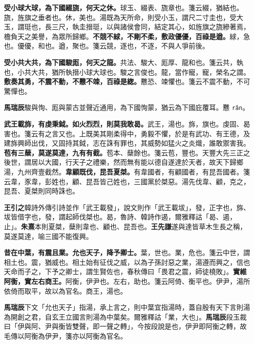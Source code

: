 \textbf{受小球大球，為下國綴旒，何天之休。}{\footnotesize 球玉、綴表、旒章也。箋云綴，猶結也。旒，旌旗之垂者也。休，美也。湯既為天所命，則受小玉，謂尺二寸圭也，受大玉，謂珽也，長三尺，執圭搢珽，以與諸侯會同，結定其心，如旌旗之旒縿著焉，檐負天之美譽，為眾所歸鄉。}\textbf{不競不絿，不剛不柔，敷政優優，百祿是遒。}{\footnotesize 絿，急也。優優，和也。遒，聚也。箋云競，逐也，不逐，不與人爭前後。}

\textbf{受小共大共，為下國駿厖，何天之龍。}{\footnotesize 共法、駿大、厖厚、龍和也。箋云共，執也，小共大共，猶所執搢小球大球也。駿之言俊也。龍，當作寵，寵，榮名之謂。}\textbf{敷奏其勇，不震不動，不戁不竦，百祿是緫。}{\footnotesize 戁恐、竦懼也。箋云不震不動，不可驚憚也。}

\begin{quoting}\textbf{馬瑞辰}駿與恂、厖與蒙古並聲近通用，為下國恂蒙，猶云為下國庇覆耳。戁 \texttt{rǎn}。\end{quoting}

\textbf{武王載旆，有虔秉鉞。如火烈烈，則莫我敢曷。}{\footnotesize 武王，湯也。旆，旗也。虔固、曷害也。箋云有之言又也。上既美其剛柔得中，勇毅不懼，於是有武功、有王德，及建旆興師出伐，又固持其鉞，志在誅有罪也，其威勢如猛火之炎熾，誰敢禦害我。}\textbf{苞有三蘖，莫遂莫達，九有有截。}{\footnotesize 苞本、蘖餘也。箋云苞，豐也。天豐大先三正之後世，謂居以大國，行天子之禮樂，然而無有能以德自遂達於天者，故天下歸鄉湯，九州齊壹截然。}\textbf{韋顧既伐，昆吾夏桀。}{\footnotesize 有韋國者，有顧國者，有昆吾國者。箋云韋，豕韋，彭姓也，顧、昆吾皆己姓也，三國黨於桀惡。湯先伐韋、顧，克之，昆吾、夏桀則同時誅也。}

\begin{quoting}\textbf{王引之}韓詩外傳引詩並作「武王載發」，說文則作「武王載坺」，發，正字也，旆、坺皆借字也，發，謂起師伐桀也。曷，魯詩、韓詩作遏，爾雅釋詁「曷、遏，止」。\textbf{朱熹}本則夏桀，蘖則韋也、顧也、昆吾也。\textbf{王先謙}遂與達皆草木生長之稱，莫遂莫達，喻三國不能復興。\end{quoting}

\textbf{昔在中葉，有震且業。允也天子，降予卿士。}{\footnotesize 葉，世也。業，危也。箋云中世，謂相土也。震，猶威也。相土始有征伐之威，以為子孫討惡之業，湯遵而興之，信也天命而子之，下予之卿士，謂生賢佐也，春秋傳曰「畏君之震，師徒橈敗」。}\textbf{實維阿衡，實左右商王。}{\footnotesize 阿衡，伊尹也。左右，助也。箋云阿倚、衡平也。伊尹，湯所依倚而取平，故以為官名。商王，湯也。}

\begin{quoting}\textbf{馬瑞辰}下文「允也天子」指湯，承上言之，則中葉宜指湯時，蓋自殷有天下言則湯為開創之君，自玄王立國言則湯為中葉矣。爾雅釋詁「業，大也」。\textbf{馬瑞辰}段玉裁曰「伊與阿、尹與衡皆雙聲，即一聲之轉」，今按段說是也，伊尹即阿衡之轉，故毛傳以阿衡為伊尹，箋亦以阿衡為官名。\end{quoting}

